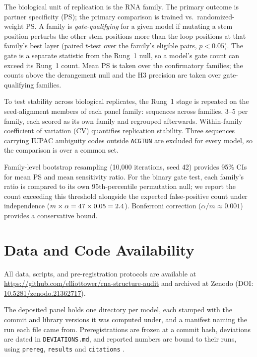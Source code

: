 \documentclass[11pt]{article}
\begin{document}
The biological unit of replication is the RNA family. The primary outcome is
partner specificity (PS); the primary comparison is trained vs.\
randomized-weight PS. A family is \emph{gate-qualifying} for a given model
if mutating a stem position perturbs the other stem positions more than the
loop positions at that family's best layer (paired $t$-test over the family's
eligible pairs, $p < 0.05$). The gate is a separate statistic from the Rung~1
null, so a model's gate count can exceed its Rung~1 count. Mean PS is taken
over the confirmatory families; the counts above the derangement null and the
H3 precision are taken over gate-qualifying families.

To test stability across biological replicates, the Rung~1 stage is repeated on
the seed-alignment members of each panel family: \multiseqN{} sequences across
\multiseqFamilies{} families, 3--5 per family, each scored as its own family and
regrouped afterwards. Within-family coefficient of variation (CV) quantifies
replication stability. Three sequences carrying IUPAC ambiguity codes outside
\texttt{ACGTUN} are excluded for every model, so the comparison is over a common
set.

Family-level bootstrap resampling (10{,}000 iterations, seed 42)
provides 95\% CIs for mean PS and mean sensitivity ratio. For the binary
gate test, each family's ratio is compared to its own 95th-percentile
permutation null; we report the count exceeding this threshold alongside
the expected false-positive count under independence
($m \times \alpha = 47{} \times 0.05 = 2.4{}$).
Bonferroni correction
($\alpha / m \approx 0.001$) provides a conservative bound.


\section*{Data and Code Availability}

All data, scripts, and pre-registration protocols are available at
\url{https://github.com/elliottower/rna-structure-audit} and archived at
Zenodo (DOI: \href{https://doi.org/10.5281/zenodo.21362717}{10.5281/zenodo.21362717}).

The deposited panel holds one directory per model, each stamped with the commit
and library versions it was computed under, and a manifest naming the run each
file came from. Preregistrations are frozen at a commit hash, deviations are
dated in \texttt{DEVIATIONS.md}, and reported numbers are bound to their runs,
using \texttt{prereg}, \texttt{results} and \texttt{citations}
\citep{tower2026reproducible}.
\end{document}
